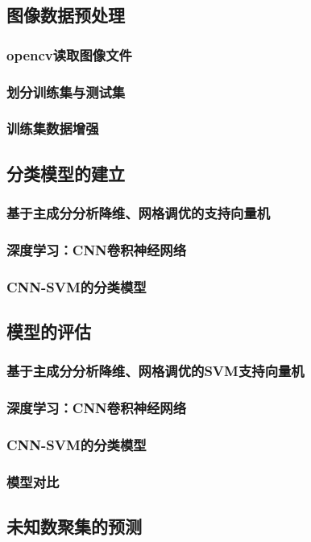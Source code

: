 \documentclass{MathorCupmodeling}
\begin{document}
	\subsection{图像数据预处理}
	\subsubsection{opencv读取图像文件}
	\subsubsection{划分训练集与测试集}
	\subsubsection{训练集数据增强}
	\subsection{分类模型的建立}
	\subsubsection{基于主成分分析降维、网格调优的支持向量机}
	\subsubsection{深度学习：CNN卷积神经网络}
	\subsubsection{CNN-SVM的分类模型}
	\subsection{模型的评估}
	\subsubsection{基于主成分分析降维、网格调优的SVM支持向量机}
	\subsubsection{深度学习：CNN卷积神经网络}
	\subsubsection{CNN-SVM的分类模型}
	\subsubsection{模型对比}
	\subsection{未知数聚集的预测}
\end{document}
